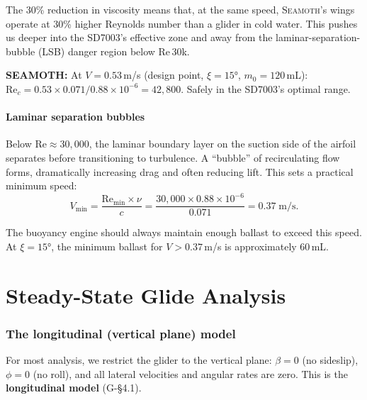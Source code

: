 \documentclass[11pt,a4paper]{article}
\newcommand{\seamoth}{\textsc{Seamoth}}
\newcommand{\note}[1]{\par\smallskip\noindent\colorbox{blue!8}{\parbox{\dimexpr\linewidth-2\fboxsep}{%
  \small\textbf{SEAMOTH:} #1}}\smallskip}
\begin{document}
The 30\% reduction in viscosity means that, at the same speed, \seamoth{}'s wings
operate at 30\% higher Reynolds number than a glider in cold water.  This pushes us
deeper into the SD7003's effective zone and away from the laminar-separation-bubble
(LSB) danger region below Re\,30k.

\note{At $V=0.53$\,m/s (design point, $\xi=15°$, $m_0=120$\,mL): $\mathrm{Re}_c = 0.53\times0.071/0.88\times10^{-6} = 42{,}800$.  Safely in the SD7003's optimal range.}

\subsection{Laminar separation bubbles}

Below $\mathrm{Re}\approx30{,}000$, the laminar boundary layer on the suction side
of the airfoil separates before transitioning to turbulence.  A ``bubble'' of
recirculating flow forms, dramatically increasing drag and often reducing lift.  This
sets a practical minimum speed:
\begin{equation}
  V_\text{min} = \frac{\mathrm{Re}_\text{min}\times\nu}{c}
  = \frac{30{,}000\times0.88\times10^{-6}}{0.071}
  = 0.37\;\text{m/s}.
\end{equation}

The buoyancy engine should always maintain enough ballast to exceed this speed.
At $\xi=15°$, the minimum ballast for $V>0.37$\,m/s is approximately 60\,mL.


\part{Steady-State Glide Analysis}

\section{The longitudinal (vertical plane) model}
\label{sec:longitudinal}

For most analysis, we restrict the glider to the vertical plane:
$\beta=0$ (no sideslip), $\phi=0$ (no roll), and all lateral velocities and
angular rates are zero.  This is the \textbf{longitudinal model} (G-\S4.1).
\end{document}
